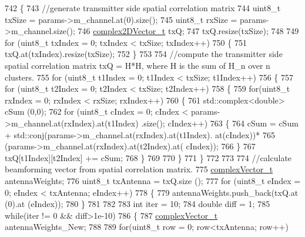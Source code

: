 \begin{DoxyCode}
742 \{
743         \textcolor{comment}{//generate transmitter side spatial correlation matrix}
744         uint8\_t txSize = params->m\_channel.at(0).size();
745         uint8\_t rxSize = params->m\_channel.size();
746         \hyperlink{namespacens3_aa25e3feece2676fd7470d50d4ba3d1d1}{complex2DVector\_t} txQ;
747         txQ.resize(txSize);
748 
749         \textcolor{keywordflow}{for} (uint8\_t txIndex = 0; txIndex < txSize; txIndex++)
750         \{
751                 txQ.at(txIndex).resize(txSize);
752         \}
753 
754         \textcolor{comment}{//compute the transmitter side spatial correlation matrix txQ = H*H, where H is the sum of H\_n over
       n clusters.}
755         \textcolor{keywordflow}{for} (uint8\_t t1Index = 0; t1Index < txSize; t1Index++)
756         \{
757                 \textcolor{keywordflow}{for} (uint8\_t t2Index = 0; t2Index < txSize; t2Index++)
758                 \{
759                         \textcolor{keywordflow}{for}(uint8\_t rxIndex = 0; rxIndex < rxSize; rxIndex++)
760                         \{
761                                 std::complex<double> cSum (0,0);
762                                 \textcolor{keywordflow}{for} (uint8\_t cIndex = 0; cIndex < params->m\_channel.at(rxIndex).at(t1Index)
      .size(); cIndex++)
763                                 \{
764                                         cSum = cSum + std::conj(params->m\_channel.at(rxIndex).at(t1Index).
      at(cIndex))*
765                                                         (params->m\_channel.at(rxIndex).at(t2Index).at(
      cIndex));
766                                 \}
767                                 txQ[t1Index][t2Index] += cSum;
768                         \}
769 
770                 \}
771         \}
772 
773 
774         \textcolor{comment}{//calculate beamforming vector from spatial correlation matrix.}
775         \hyperlink{namespacens3_a6a7f75817ae50e6ac47414955b17d926}{complexVector\_t} antennaWeights;
776         uint8\_t txAntenna = txQ.size ();
777         \textcolor{keywordflow}{for} (uint8\_t eIndex = 0; eIndex < txAntenna; eIndex++)
778         \{
779                 antennaWeights.push\_back(txQ.at (0).at (eIndex));
780         \}
781 
782 
783         \textcolor{keywordtype}{int} iter = 10;
784         \textcolor{keywordtype}{double} diff = 1;
785         \textcolor{keywordflow}{while}(iter != 0 && diff>1e-10)
786         \{
787                 \hyperlink{namespacens3_a6a7f75817ae50e6ac47414955b17d926}{complexVector\_t} antennaWeights\_New;
788 
789                 \textcolor{keywordflow}{for}(uint8\_t row = 0; row<txAntenna; row++)

\end{DoxyCode}
